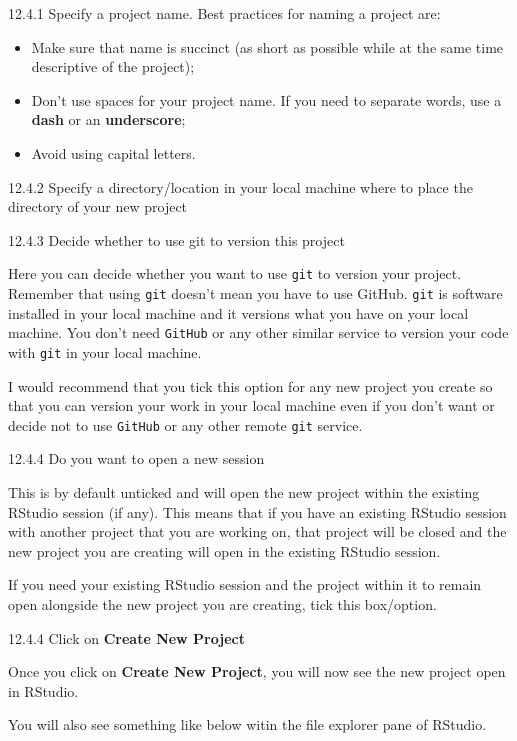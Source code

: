 \documentclass[
  12pt,
]{book}
\providecommand{\tightlist}{%
  \setlength{\itemsep}{0pt}\setlength{\parskip}{0pt}}
\begin{document}
12.4.1 Specify a project name. Best practices for naming a project are:

\begin{itemize}
\tightlist
\item
  Make sure that name is succinct (as short as possible while at the same time descriptive of the project);
\item
  Don't use spaces for your project name. If you need to separate words, use a \textbf{dash} or an \textbf{underscore};
\item
  Avoid using capital letters.
\end{itemize}

12.4.2 Specify a directory/location in your local machine where to place the directory of your new project

12.4.3 Decide whether to use git to version this project

Here you can decide whether you want to use \texttt{git} to version your project. Remember that using \texttt{git} doesn't mean you have to use GitHub. \texttt{git} is software installed in your local machine and it versions what you have on your local machine. You don't need \texttt{GitHub} or any other similar service to version your code with \texttt{git} in your local machine.

I would recommend that you tick this option for any new project you create so that you can version your work in your local machine even if you don't want or decide not to use \texttt{GitHub} or any other remote \texttt{git} service.

12.4.4 Do you want to open a new session

This is by default unticked and will open the new project within the existing RStudio session (if any). This means that if you have an existing RStudio session with another project that you are working on, that project will be closed and the new project you are creating will open in the existing RStudio session.

If you need your existing RStudio session and the project within it to remain open alongside the new project you are creating, tick this box/option.

12.4.4 Click on \textbf{Create New Project}

Once you click on \textbf{Create New Project}, you will now see the new project open in RStudio.

You will also see something like below witin the file explorer pane of RStudio.
\end{document}
